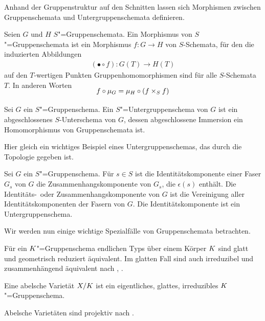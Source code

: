 Anhand der Gruppenstruktur auf den Schnitten lassen sich
Morphismen zwischen Gruppenschemata und Untergruppenschemata
definieren.
\begin{Definition}
  Seien $G$ und $H$ $S$"=Gruppenschemata.
  Ein Morphismus von $S$"=Gruppenschemata ist ein Morphismus $f\colon
  G\to H$ von $S$-Schemata, für den die induzierten Abbildungen
  \begin{gather*}
    (\bullet\circ f)\colon G(T)\to H(T)
  \end{gather*}auf den $T$-wertigen Punkten
  Gruppenhomomorphismen sind für alle $S$-Schemata $T$.
  In anderen Worten
  \begin{gather*}
    \SwapAboveDisplaySkip
    f\circ\mu_G = \mu_H\circ(f\times_S f)
  \end{gather*}
\end{Definition}

\begin{Definition}[Untergruppenschema]
  Sei $G$ ein $S$"=Gruppenschema.
  Ein $S$"=Untergruppenschema von $G$ ist ein abgeschlossenes
  $S$-Unterschema von $G$, dessen abgeschlossene Immersion ein
  Homomorphismus von Gruppenschemata ist.
\end{Definition}

Hier gleich ein wichtiges Beispiel eines Untergruppenschemas, das
durch die Topologie gegeben ist.
\begin{Definition}[Identitätskomponente]
  Sei $G$ ein $S$"=Gruppenschema.
  Für $s\in S$ ist die Identitätskomponente einer Faser $G_s$ von $G$
  die Zusammenhangskomponente von $G_s$, die $\epsilon(s)$ enthält.
  Die Identitäts-~oder Zusammenhangskomponente von $G$ ist
  die Vereinigung aller Identitätskomponenten der Fasern von $G$.
  Die Identitätskomponente ist ein Untergruppenschema.
\end{Definition}

Wir werden nun einige wichtige Spezialfälle von Gruppenschemata
betrachten.
\begin{Bemerkung}\label{gruppenschemaaequivalenzen}
  Für ein $K$"=Gruppenschema endlichen Typs über einem Körper $K$
  sind glatt und geometrisch reduziert äquivalent.
  Im glatten Fall sind auch irreduzibel und zusammenhängend äquivalent
  nach \cite[Exercise 3.16]{wedhorn}, \cite[Corollary 16.51]{wedhorn}.
\end{Bemerkung}
\begin{Definition}\label{def:abelschevarietaet}
  Eine abelsche Varietät $X/K$ ist ein eigentliches, glattes,
  irreduzibles $K$"=Gruppenschema.
\end{Definition}
\begin{Bemerkung}\label{thm:abvarietaetprojektiv}
  Abelsche Varietäten sind projektiv nach
  \cite[9.6, Proposition 4]{bosch}.
\end{Bemerkung}

